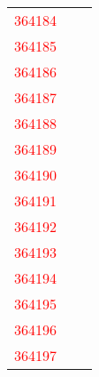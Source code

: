 {\begin{tabular}{|l|r|r|}
\textcolor{red}{364184}  & &\\
\textcolor{red}{364185}  & &\\
\textcolor{red}{364186}  & &\\
\textcolor{red}{364187}  & &\\
\textcolor{red}{364188}  & &\\
\textcolor{red}{364189}  & &\\
\textcolor{red}{364190}  & &\\
\textcolor{red}{364191}  & &\\
\textcolor{red}{364192}  & &\\
\textcolor{red}{364193}  & &\\
\textcolor{red}{364194}  & &\\
\textcolor{red}{364195}  & &\\
\textcolor{red}{364196}  & &\\
\textcolor{red}{364197}  & &\\
\hline
\end{tabular}}

